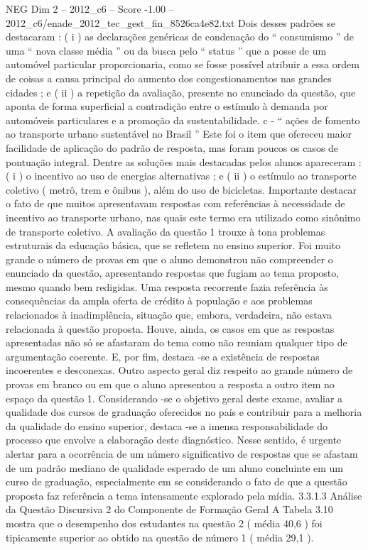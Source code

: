 \begin{textsample}{NEG Dim 2 – 2012\_c6 – Score -1.00 – 2012\_c6/enade\_2012\_tec\_gest\_fin\_8526ca4e82.txt}
Dois desses padrões se destacaram : ( i ) as declarações genéricas de condenação do “ consumismo ” de uma “ nova classe média ” ou da busca pelo “ status ” que a posse de um automóvel particular proporcionaria, como se fosse possível atribuir a essa ordem de coisas a causa principal do aumento dos congestionamentos nas grandes cidades ; e ( ii ) a repetição da avaliação, presente no enunciado da questão, que aponta de forma superficial a contradição entre o estímulo à demanda por automóveis particulares e a promoção da sustentabilidade. c - “ ações de fomento ao transporte urbano sustentável no Brasil ” Este foi o item que ofereceu maior facilidade de aplicação do padrão de resposta, mas foram poucos os casos de pontuação integral.
Dentre as soluções mais destacadas pelos alunos apareceram : ( i ) o incentivo ao uso de energias alternativas ; e ( ii ) o estímulo ao transporte coletivo ( metrô, trem e ônibus ), além do uso de bicicletas.
Importante destacar o fato de que muitos apresentavam respostas com referências à necessidade de incentivo ao transporte urbano, nas quais este termo era utilizado como sinônimo de transporte coletivo.
A avaliação da questão 1 trouxe à tona problemas estruturais da educação básica, que se refletem no ensino superior.
Foi muito grande o número de provas em que o aluno demonstrou não compreender o enunciado da questão, apresentando respostas que fugiam ao tema proposto, mesmo quando bem redigidas.
Uma resposta recorrente fazia referência às consequências da ampla oferta de crédito à população e aos problemas relacionados à inadimplência, situação que, embora, verdadeira, não estava relacionada à questão proposta.
Houve, ainda, os casos em que as respostas apresentadas não só se afastaram do tema como não reuniam qualquer tipo de argumentação coerente.
E, por fim, destaca -se a existência de respostas incoerentes e desconexas.
Outro aspecto geral diz respeito ao grande número de provas em branco ou em que o aluno apresentou a resposta a outro item no espaço da questão 1.
Considerando -se o objetivo geral deste exame, avaliar a qualidade dos cursos de graduação oferecidos no país e contribuir para a melhoria da qualidade do ensino superior, destaca -se a imensa responsabilidade do processo que envolve a elaboração deste diagnóstico.
Nesse sentido, é urgente alertar para a ocorrência de um número significativo de respostas que se afastam de um padrão mediano de qualidade esperado de um aluno concluinte em um curso de graduação, especialmente em se considerando o fato de que a questão proposta faz referência a tema intensamente explorado pela mídia. 3.3.1.3 Análise da Questão Discursiva 2 do Componente de Formação Geral A Tabela 3.10 mostra que o desempenho dos estudantes na questão 2 ( média 40,6 ) foi tipicamente superior ao obtido na questão de número 1 ( média 29,1 ).

\end{textsample}

